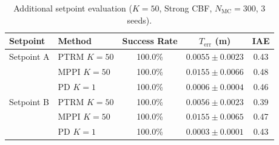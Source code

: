 \begin{table}[t]
\centering
\caption{Additional setpoint evaluation ($K\!=\!50$, Strong CBF, $N_{\mathrm{MC}}=300$, 3 seeds).}
\label{tab:setpoint}
\begin{tabular}{llccc}
\toprule
Setpoint & Method & Success Rate & $T_{\mathrm{err}}$ (m) & IAE \\
\midrule
  Setpoint A & PTRM $K\!=\!50$ & 100.0\% & $0.0055 \pm 0.0023$ & 0.43 \\
   & MPPI $K\!=\!50$ & 100.0\% & $0.0155 \pm 0.0066$ & 0.48 \\
   & PD $K\!=\!1$ & 100.0\% & $0.0006 \pm 0.0004$ & 0.46 \\
  \midrule
  Setpoint B & PTRM $K\!=\!50$ & 100.0\% & $0.0056 \pm 0.0023$ & 0.39 \\
   & MPPI $K\!=\!50$ & 100.0\% & $0.0155 \pm 0.0065$ & 0.47 \\
   & PD $K\!=\!1$ & 100.0\% & $0.0003 \pm 0.0001$ & 0.43 \\
\bottomrule
\end{tabular}
\end{table}
